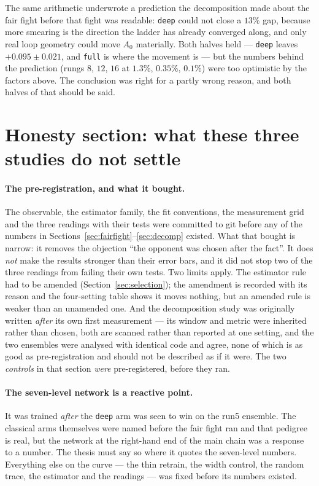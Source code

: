 \documentclass[11pt,a4paper]{article}
\newcommand{\Azero}{A_0}
\newcommand{\arm}[1]{\texttt{#1}}
\begin{document}
The same arithmetic underwrote a prediction the decomposition made about the
fair fight before that fight was readable: \arm{deep} could not close a $13\%$
gap, because more smearing is the direction the ladder has already converged
along, and only real loop geometry could move $\Azero$ materially. Both halves
held --- \arm{deep} leaves $+0.095 \pm 0.021$, and \arm{full} is where the
movement is --- but the numbers behind the prediction (rungs $8$, $12$, $16$ at
$1.3\%$, $0.35\%$, $0.1\%$) were too optimistic by the factors above. The
conclusion was right for a partly wrong reason, and both halves of that should
be said.

\section{Honesty section: what these three studies do not settle}
\label{sec:honesty}

\paragraph{The pre-registration, and what it bought.} The observable, the
estimator family, the fit conventions, the measurement grid and the three
readings with their tests were committed to git before any of the numbers in
Sections~\ref{sec:fairfight}--\ref{sec:decomp} existed. What that bought is
narrow: it removes the objection ``the opponent was chosen after the fact''. It
does \emph{not} make the results stronger than their error bars, and it did not
stop two of the three readings from failing their own tests. Two limits apply.
The estimator rule had to be amended (Section~\ref{sec:selection}); the
amendment is recorded with its reason and the four-setting table shows it moves
nothing, but an amended rule is weaker than an unamended one. And the
decomposition study was originally written \emph{after} its own first
measurement --- its window and metric were inherited rather than chosen, both
are scanned rather than reported at one setting, and the two ensembles were
analysed with identical code and agree, none of which is as good as
pre-registration and should not be described as if it were. The two
\emph{controls} in that section \emph{were} pre-registered, before they ran.

\paragraph{The seven-level network is a reactive point.} It was trained
\emph{after} the \arm{deep} arm was seen to win on the run5 ensemble. The
classical arms themselves were named before the fair fight ran and that pedigree
is real, but the network at the right-hand end of the main chain was a response
to a number. The thesis must say so where it quotes the seven-level numbers.
Everything else on the curve --- the thin retrain, the width control, the random
trace, the estimator and the readings --- was fixed before its numbers existed.
\end{document}
